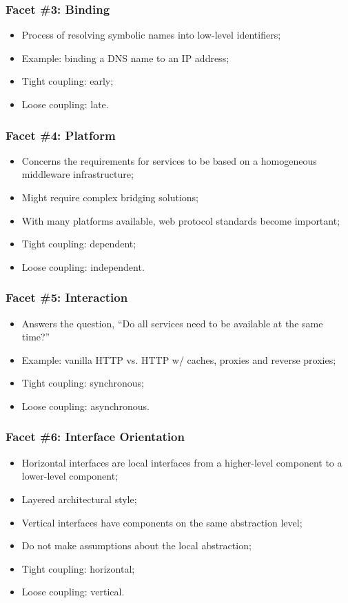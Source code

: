 \documentclass{beamer}
\begin{document}
\begin{frame}
    \frametitle{Facet \#3: Binding}
    \begin{itemize}
        \item Process of resolving symbolic names into low-level identifiers;
        \item Example: binding a DNS name to an IP address;
        \item Tight coupling: early;
        \item Loose coupling: late.
    \end{itemize}
\end{frame}

\begin{frame}
    \frametitle{Facet \#4: Platform}
    \begin{itemize}
        \item Concerns the requirements for services to be based on a homogeneous middleware infrastructure;
        \item Might require complex bridging solutions;
        \item With many platforms available, web protocol standards become important;
        \item Tight coupling: dependent;
        \item Loose coupling: independent.
    \end{itemize}
\end{frame}

\begin{frame}
    \frametitle{Facet \#5: Interaction}
    \begin{itemize}
        \item Answers the question, ``Do all services need to be available at the same time?''
        \item Example: vanilla HTTP vs. HTTP w/ caches, proxies and reverse proxies;
        \item Tight coupling: synchronous;
        \item Loose coupling: asynchronous.
    \end{itemize}
\end{frame}

\begin{frame}
    \frametitle{Facet \#6: Interface Orientation}
    \begin{itemize}
        \item Horizontal interfaces are local interfaces from a higher-level component to a lower-level component;
        \item Layered architectural style;
        \item Vertical interfaces have components on the same abstraction level;
        \item Do not make assumptions about the local abstraction;
        \item Tight coupling: horizontal;
        \item Loose coupling: vertical.
    \end{itemize}
\end{frame}
\end{document}
